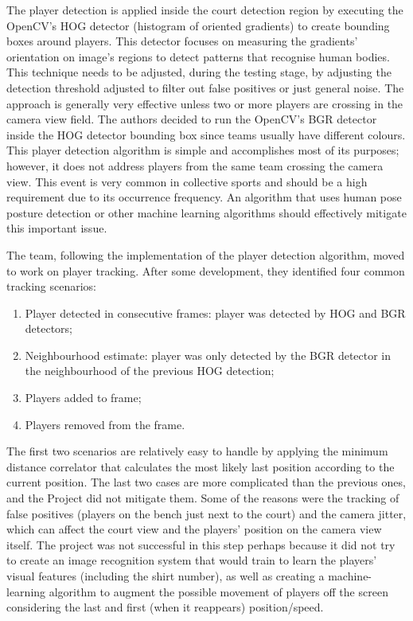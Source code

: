\documentclass[
    11pt,
    oneside
]{report}
\begin{document}
The player detection is applied inside the court detection region by executing the OpenCV's \cite{opencv} HOG detector (histogram of oriented gradients) to create bounding boxes around players. This detector focuses on measuring the gradients' orientation on image's regions to detect patterns that recognise human bodies. This technique needs to be adjusted, during the testing stage, by adjusting the detection threshold adjusted to filter out false positives or just general noise. The approach is generally very effective unless two or more players are crossing in the camera view field. The authors decided to run the OpenCV's \cite{opencv} BGR detector inside the HOG detector bounding box since teams usually have different colours. This player detection algorithm is simple and accomplishes most of its purposes; however, it does not address players from the same team crossing the camera view. This event is very common in collective sports and should be a high requirement due to its occurrence frequency. An algorithm that uses human pose posture detection or other machine learning algorithms should effectively mitigate this important issue.


The team, following the implementation of the player detection algorithm, moved to work on player tracking. After some development, they identified four common tracking scenarios:
\begin{enumerate}
    \item Player detected in consecutive frames: player was detected by HOG and BGR detectors;
    \item Neighbourhood estimate: player was only detected by the BGR detector in the neighbourhood of the previous HOG detection;
    \item Players added to frame;
    \item Players removed from the frame.
\end{enumerate}
The first two scenarios are relatively easy to handle by applying the minimum distance correlator that calculates the most likely last position according to the current position. The last two cases are more complicated than the previous ones, and the Project did not mitigate them. Some of the reasons were the tracking of false positives (players on the bench just next to the court) and the camera jitter, which can affect the court view and the players' position on the camera view itself. The project \cite{baskettrack} was not successful in this step perhaps because it did not try to create an image recognition system that would train to learn the players' visual features (including the shirt number), as well as creating a machine-learning algorithm to augment the possible movement of players off the screen considering the last and first (when it reappears) position/speed.
\end{document}
